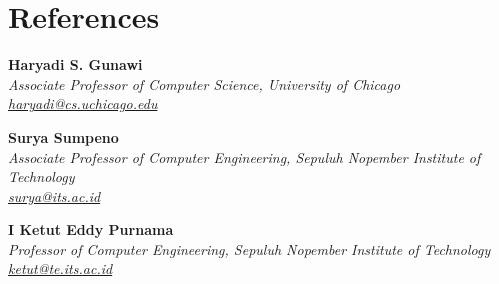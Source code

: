 \section{References}
    \textbf{Haryadi S. Gunawi}\\
    \textit{Associate Professor of Computer Science, University of Chicago}\\
    \textit{\href{mailto:haryadi@cs.uchicago.edu}{haryadi@cs.uchicago.edu}}

    \vspace{0.2 cm}

    \textbf{Surya Sumpeno}\\
    \textit{Associate Professor of Computer Engineering, Sepuluh Nopember Institute of Technology}\\
    \textit{\href{mailto:surya@its.ac.id}{surya@its.ac.id}}

    \vspace{0.2 cm}

    \textbf{I Ketut Eddy Purnama}\\
    \textit{Professor of Computer Engineering, Sepuluh Nopember Institute of Technology}\\
    \textit{\href{mailto:ketut@te.its.ac.id}{ketut@te.its.ac.id}}
